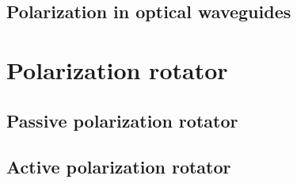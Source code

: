 \documentclass[../main.tex]{subfiles}
\begin{document}
		\subsection{Polarization in optical waveguides}

	\section{Polarization rotator}
	
		\subsection{Passive polarization rotator}
	
		\subsection{Active polarization rotator}
\end{document}
